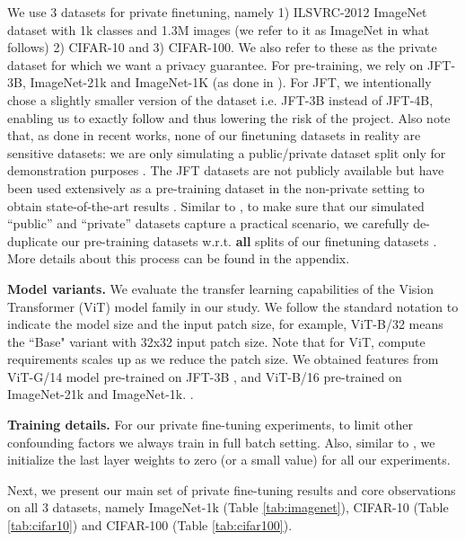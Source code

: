 \documentclass[letterpaper]{article} \usepackage{fullpage}
\begin{document}
We use 3 datasets for private finetuning, namely 1) ILSVRC-2012 ImageNet dataset \citep{deng2009imagenet} with 1k classes and 1.3M images (we refer to it as ImageNet in what follows) 2) CIFAR-10 and 3) CIFAR-100. We also refer to these as the private dataset for which we want a privacy guarantee. For pre-training, we rely on JFT-3B, ImageNet-21k and ImageNet-1K (as done in \cite{zhai2021scaling}). For JFT, we intentionally chose a slightly smaller version of the dataset i.e. JFT-3B instead of JFT-4B, enabling us to exactly follow \cite{zhai2021scaling} and thus lowering the risk of the project. Also note that, as done in recent works, none of our finetuning datasets in reality are sensitive datasets: we are only simulating a public/private dataset split only for demonstration purposes \citep{kurakin2022training, mehta2022large, dm_transfer_2022}. The JFT datasets are not publicly available but have been used extensively as a pre-training dataset in the non-private setting to obtain state-of-the-art results \citep{dosovitskiy2021an_vit,brock2021characterizing,tolstikhin2021mlpmixer,zhai2021scaling}. Similar to \cite{mehta2022large,dm_transfer_2022}, to make sure that our simulated ``public'' and ``private'' datasets capture a practical scenario, we carefully de-duplicate our pre-training datasets w.r.t. \textbf{all} splits of our finetuning datasets \citep{bit-paper,dosovitskiy2021an_vit}. More details about this process can be found in the appendix.

\textbf{Model variants.} We evaluate the transfer learning capabilities of the Vision Transformer (ViT) \citep{dosovitskiy2021an_vit} model family in our study. We follow the standard notation to indicate the model size and the input patch size, for example, ViT-B/32 means the ``Base" variant with 32x32 input patch size. Note that for ViT, compute requirements scales up as we reduce the patch size. We obtained features from ViT-G/14 model pre-trained on JFT-3B \citep{zhai2021scaling}, and ViT-B/16 pre-trained on ImageNet-21k and ImageNet-1k. \citep{augreg_steiner2021train}.

\textbf{Training details.} For our private fine-tuning experiments, to limit other confounding factors we always train in full batch setting. Also, similar to \cite{mehta2022large}, we initialize the last layer weights to zero (or a small value) for all our experiments.

Next, we present our main set of private fine-tuning results and core observations on all 3 datasets, namely ImageNet-1k (Table \ref{tab:imagenet}), CIFAR-10 (Table \ref{tab:cifar10}) and CIFAR-100 (Table \ref{tab:cifar100}).
\end{document}
